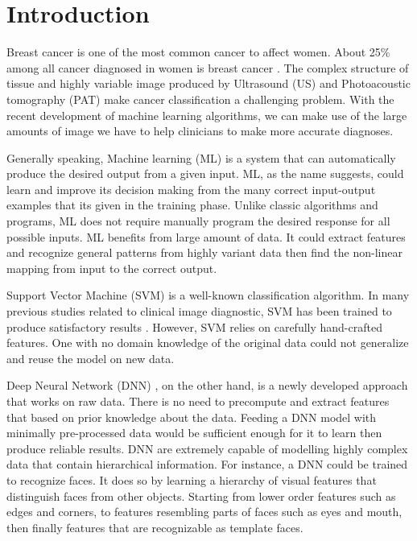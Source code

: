 \chapter{Introduction} %

Breast cancer is one of the most common cancer to affect women. About 25\% among all cancer diagnosed in women is breast cancer \citep{Siegel2015}. The complex structure of tissue and highly variable image produced by Ultrasound (US) and Photoacoustic tomography (PAT) make cancer classification a challenging problem. With the recent development of machine learning algorithms, we can make use of the large amounts of image we have to help clinicians to make more accurate diagnoses. 

Generally speaking, Machine learning (ML) is a system that can automatically produce the desired output from a given input. ML, as the name suggests, could learn and improve its decision making from the many correct input-output examples that its given in the training phase. Unlike classic algorithms and programs, ML does not require manually program the desired response for all possible inputs. ML benefits from large amount of data. It could extract features and recognize general patterns from highly variant data then find the non-linear mapping from input to the correct output. 

Support Vector Machine (SVM) is a well-known classification algorithm. In many previous studies related to clinical image diagnostic, SVM has been trained to produce satisfactory results \citep{Vassis2015}. However, SVM relies on carefully hand-crafted features. One with no domain knowledge of the original data could not generalize and reuse the model on new data.

Deep Neural Network (DNN) \citep{LeCun2015}, on the other hand, is a newly developed approach that works on raw data. There is no need to precompute and extract features that based on prior knowledge about the data. Feeding a DNN model with minimally pre-processed data would be sufficient enough for it to learn then produce reliable results. DNN are extremely capable of modelling highly complex data that contain hierarchical information. For instance, a DNN could be trained to recognize faces. It does so by learning a hierarchy of visual features that distinguish faces from other objects. Starting from lower order features such as edges and corners, to features resembling parts of faces such as eyes and mouth, then finally features that are recognizable as template faces.


